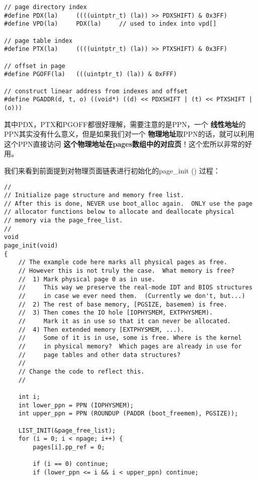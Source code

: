 \documentclass{article}
\newcommand{\highlight}[1]{{\bfseries \color{red}  #1}}
\newcommand{\funcname}[1]{{\ttfamily \small #1}}
\begin{document}
\begin{CJK*}{UTF8}{gkai}
\begin{lstlisting}[style=ccode, firstnumber=16, title={\scriptsize \ttfamily \bfseries inc/mmu.h}]
// page directory index
#define PDX(la)		((((uintptr_t) (la)) >> PDXSHIFT) & 0x3FF)
#define VPD(la)		PDX(la)		// used to index into vpd[]

// page table index
#define PTX(la)		((((uintptr_t) (la)) >> PTXSHIFT) & 0x3FF)

// offset in page
#define PGOFF(la)	(((uintptr_t) (la)) & 0xFFF)

// construct linear address from indexes and offset
#define PGADDR(d, t, o)	((void*) ((d) << PDXSHIFT | (t) << PTXSHIFT | (o)))
\end{lstlisting}


其中PDX，PTX和PGOFF都很好理解，需要注意的是PPN，一个\highlight{线性地址}的PPN其实没有什么意义，但是如果我们对一个\highlight{物理地址}取PPN的话，就可以利用这个PPN直接访问\highlight{这个物理地址在pages数组中的对应页}！这个宏所以非常的好用。

我们来看到前面提到对物理页面链表进行初始化的\funcname{page\_init ()} 过程：



\begin{lstlisting}[style=ccode, title={\scriptsize \ttfamily \bfseries kern/pmap.c: boot\_init ()}]
//
// Initialize page structure and memory free list.
// After this is done, NEVER use boot_alloc again.  ONLY use the page
// allocator functions below to allocate and deallocate physical
// memory via the page_free_list.
//
void
page_init(void)
{
    // The example code here marks all physical pages as free.
    // However this is not truly the case.  What memory is free?
    //  1) Mark physical page 0 as in use.
    //     This way we preserve the real-mode IDT and BIOS structures
    //     in case we ever need them.  (Currently we don't, but...)
    //  2) The rest of base memory, [PGSIZE, basemem) is free.
    //  3) Then comes the IO hole [IOPHYSMEM, EXTPHYSMEM).
    //     Mark it as in use so that it can never be allocated.
    //  4) Then extended memory [EXTPHYSMEM, ...).
    //     Some of it is in use, some is free. Where is the kernel
    //     in physical memory?  Which pages are already in use for
    //     page tables and other data structures?
    //
    // Change the code to reflect this.
    //

    int i;
    int lower_ppn = PPN (IOPHYSMEM);
    int upper_ppn = PPN (ROUNDUP (PADDR (boot_freemem), PGSIZE));

    LIST_INIT(&page_free_list);
    for (i = 0; i < npage; i++) {
        pages[i].pp_ref = 0;

        if (i == 0) continue;
        if (lower_ppn <= i && i < upper_ppn) continue;
 

\end{lstlisting}
\end{CJK*}
\end{document}

